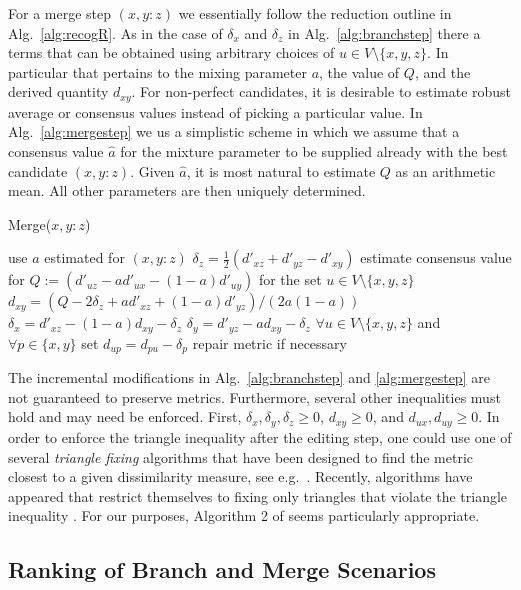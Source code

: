 \documentclass{article}
\begin{document}
For a merge step $(x,y:z)$ we essentially follow the reduction outline in
Alg.~\ref{alg:recogR}. As in the case of $\delta_x$ and $\delta_z$ in
Alg.~\ref{alg:branchstep} there a terms that can be obtained using
arbitrary choices of $u\in V\setminus\{x,y,z\}$. In particular that
pertains to the mixing parameter $a$, the value of $Q$, and the derived
quantity $d_{xy}$. For non-perfect candidates, it is desirable to estimate
robust average or consensus values instead of picking a particular value.
In Alg.~\ref{alg:mergestep} we us a simplistic scheme in which we assume
that a consensus value $\hat a$ for the mixture parameter to be supplied
already with the best candidate $(x,y:z)$. Given $\hat a$, it is most
natural to estimate $Q$ as an arithmetic mean. All other parameters are
then uniquely determined.

\begin{algorithm}[H]
\caption{Merge($x,y:z$)} 
\label{alg:mergestep} 
\SetAlgoLined
use $a$ estimated for $(x,y:z)$\;
$\delta_z = \frac{1}{2}(d'_{xz}+d'_{yz}-d'_{xy})$\;
estimate consensus value for $Q:=(d'_{uz}-a d'_{ux}-(1-a) d'_{uy})$ for the 
set $u\in V\setminus\{x,y,z\}$\;
$d_{xy} = (Q-2 \delta_z + a d'_{xz}+(1-a) d'_{yz})/(2a(1-a))$\;
$\delta_x = d'_{xz} - (1-a) d_{xy} - \delta_z$\;
$\delta_y = d'_{yz} -   a   d_{xy} - \delta_z$\;
$\forall u\in V\setminus\{x,y,z\}$ and $\forall p\in\{x,y\}$ set   
$d_{up} = d_{pu} -\delta_p$\;
repair metric if necessary\;
\end{algorithm} 

The incremental modifications in Alg.~\ref{alg:branchstep} and
\ref{alg:mergestep} are not guaranteed to preserve metrics. Furthermore,
several other inequalities must hold and may need be enforced. First,
$\delta_x,\delta_y,\delta_z\ge 0$, $d_{xy}\ge 0$, and $d_{ux},d_{uy}\ge
0$. In order to enforce the triangle inequality after the editing step, one
could use one of several \emph{triangle fixing} algorithms that have been
designed to find the metric closest to a given dissimilarity measure, see
e.g.\ \cite{Sra:05,Brickel:08}. Recently, algorithms have appeared that
restrict themselves to fixing only triangles that violate the triangle
inequality \cite{Gilbert:17}. For our purposes, Algorithm 2 of
\cite{Gilbert:17} seems particularly appropriate.

\subsection{Ranking of Branch and Merge Scenarios}
\end{document}

